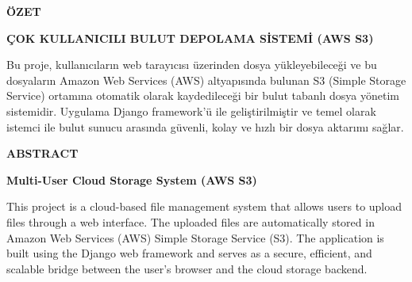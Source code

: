 {}


\begin{center}
\textbf{\large ÖZET}

\textbf{ÇOK KULLANICILI BULUT DEPOLAMA SİSTEMİ (AWS S3)}
\end{center}

Bu proje, kullanıcıların web tarayıcısı üzerinden dosya yükleyebileceği ve bu dosyaların Amazon Web Services (AWS) altyapısında bulunan S3 (Simple Storage Service) ortamına otomatik olarak kaydedileceği bir bulut tabanlı dosya yönetim sistemidir. Uygulama Django framework’ü ile geliştirilmiştir ve temel olarak istemci ile bulut sunucu arasında güvenli, kolay ve hızlı bir dosya aktarımı sağlar.

\vspace{2cm}







\newpage
\begin{center}
\textbf{\large ABSTRACT}

\textbf{Multi-User Cloud Storage System (AWS S3)}
\end{center}

This project is a cloud-based file management system that allows users to upload files through a web interface. The uploaded files are automatically stored in Amazon Web Services (AWS) Simple Storage Service (S3). The application is built using the Django web framework and serves as a secure, efficient, and scalable bridge between the user’s browser and the cloud storage backend.

\vspace{2cm}



\pagebreak{}


